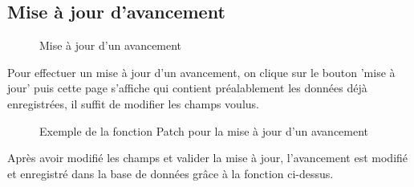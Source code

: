 \documentclass[a4paper]{report}
\begin{document}
\begin{doublespace}
\subsection{Mise à jour d'avancement}
\begin{figure}[H]
	\begin{center}
		\caption{Mise à jour d'un avancement}
	\end{center}
\end{figure}
Pour effectuer un mise à jour d'un avancement, on clique sur le bouton 'mise à jour' puis cette page s'affiche qui contient préalablement les données déjà enregistrées, il suffit de modifier les champs voulus.
\begin{figure}[H]
	\begin{center}
		\caption{Exemple de la fonction Patch pour la mise à jour d'un avancement}
	\end{center}
\end{figure}
Après avoir modifié les champs et valider la mise à jour, l'avancement est modifié et enregistré dans la base de données grâce à la fonction ci-dessus.

\end{doublespace}
\end{document}
